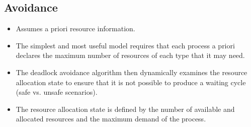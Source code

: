 \documentclass[a4paper, 11pt, accentcolor = tud3b]{tudreport}
\begin{document}
            \subsection{Avoidance}
                \begin{itemize}
                	\item Assumes a priori resource information.
                	\item The simplest and most useful model requires that each process a priori declares the maximum number of resources of each type that it may need.
                	\item The deadlock avoidance algorithm then dynamically examines the resource allocation state to ensure that it is not possible to produce a waiting cycle (safe vs. unsafe scenarios).
                	\item The resource allocation state is defined by the number of available and allocated resources and the maximum demand of the process.
                \end{itemize}
            
\end{document}
